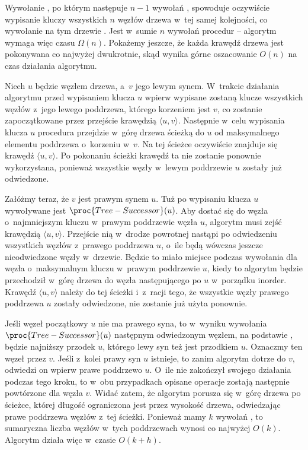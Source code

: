 \exercise %
Wywołanie , po którym następuje $n-1$ wywołań , spowoduje oczywiście wypisanie kluczy wszystkich $n$ węzłów drzewa w~tej samej kolejności, co wywołanie na tym drzewie .
Jest w~sumie $n$ wywołań procedur -- algorytm wymaga więc czasu $\Omega(n)$.
Pokażemy jeszcze, że każda krawędź drzewa jest pokonywana co najwyżej dwukrotnie, skąd wynika górne oszacowanie $O(n)$ na czas działania algorytmu.

Niech $u$ będzie węzłem drzewa, a~$v$ jego lewym synem.
W~trakcie działania algorytmu przed wypisaniem klucza $u$ wpierw wypisane zostaną klucze wszystkich węzłów z~jego lewego poddrzewa, którego korzeniem jest $v$, co zostanie zapoczątkowane przez przejście krawędzią $\langle u,v\rangle$.
Następnie w~celu wypisania klucza $u$ procedura  przejdzie w~górę drzewa ścieżką do $u$ od maksymalnego elementu poddrzewa o~korzeniu w~$v$.
Na tej ścieżce oczywiście znajduje się krawędź $\langle u,v\rangle$.
Po pokonaniu ścieżki krawędź ta nie zostanie ponownie wykorzystana, ponieważ wszystkie węzły w~lewym poddrzewie $u$ zostały już odwiedzone.

Załóżmy teraz, że $v$ jest prawym synem $u$.
Tuż po wypisaniu klucza $u$ wywoływane jest $\proc{Tree-Successor}(u)$.
Aby dostać się do węzła o~najmniejszym kluczu w~prawym poddrzewie węzła $u$, algorytm musi zejść krawędzią $\langle u,v\rangle$.
Przejście nią w~drodze powrotnej nastąpi po odwiedzeniu wszystkich węzłów z~prawego poddrzewa $u$, o~ile będą wówczas jeszcze nieodwiedzone węzły w~drzewie.
Będzie to miało miejsce podczas wywołania  dla węzła o~maksymalnym kluczu w~prawym poddrzewie $u$, kiedy to algorytm będzie przechodził w~górę drzewa do węzła następującego po $u$ w~porządku inorder.
Krawędź $\langle u,v\rangle$ należy do tej ścieżki i~z~racji tego, że wszystkie węzły prawego poddrzewa $u$ zostały odwiedzone, nie zostanie już użyta ponownie.

\exercise %
Jeśli węzeł początkowy $u$ nie ma prawego syna, to w~wyniku wywołania $\proc{Tree-Successor}(u)$ następnym odwiedzonym węzłem, na podstawie , będzie najniższy przodek $u$, którego lewy syn też jest przodkiem $u$.
Oznaczmy ten węzeł przez $v$.
Jeśli z~kolei prawy syn $u$ istnieje, to zanim algorytm dotrze do $v$, odwiedzi on wpierw prawe poddrzewo $u$.
O~ile nie zakończył swojego działania podczas tego kroku, to w~obu przypadkach opisane operacje zostają następnie powtórzone dla węzła $v$.
Widać zatem, że algorytm porusza się w~górę drzewa po ścieżce, której długość ograniczona jest przez wysokość drzewa, odwiedzając prawe poddrzewa węzłów z~tej ścieżki.
Ponieważ mamy $k$ wywołań , to sumaryczna liczba węzłów w~tych poddrzewach wynosi co najwyżej $O(k)$.
Algorytm działa więc w~czasie $O(k+h)$.

